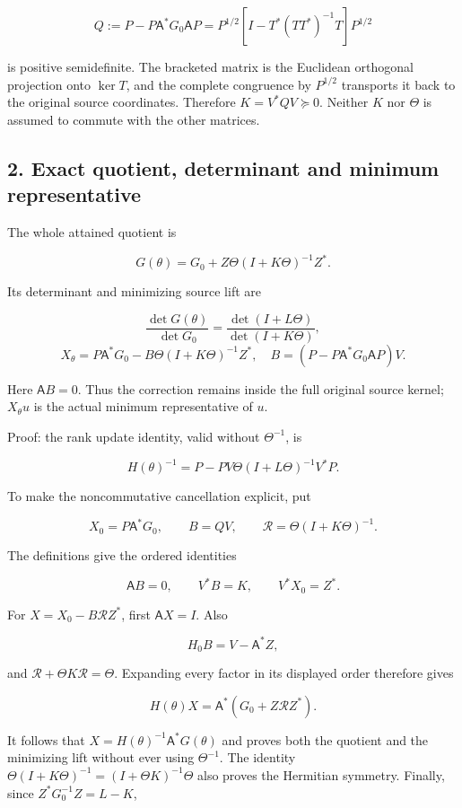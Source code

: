 \[
 Q:=P-P\mathsf A^*G_0\mathsf A P
 =P^{1/2}\!\left[I-T^*(TT^*)^{-1}T\right]P^{1/2}
\]

is positive semidefinite. The bracketed matrix is the Euclidean
orthogonal projection onto \(\ker T\), and the complete congruence by
\(P^{1/2}\) transports it back to the original source coordinates.
Therefore \(K=V^*QV\succeq0\). Neither \(K\) nor \(\Theta\) is assumed
to commute with the other matrices.

\subsection{2. Exact quotient, determinant and minimum
representative}\label{exact-quotient-determinant-and-minimum-representative}

The whole attained quotient is

\[
 \boxed{G(\theta)=G_0+Z\Theta(I+K\Theta)^{-1}Z^*.}
\]

Its determinant and minimizing source lift are

\[
 \boxed{\frac{\det G(\theta)}{\det G_0}
 =\frac{\det(I+L\Theta)}{\det(I+K\Theta)},}
\] \[
 \boxed{X_\theta=P\mathsf A^*G_0
 -B\Theta(I+K\Theta)^{-1}Z^*,\quad
 B=(P-P\mathsf A^*G_0\mathsf A P)V.}
\]

Here \(\mathsf A B=0\). Thus the correction remains inside the full
original source kernel; \(X_\theta u\) is the actual minimum
representative of \(u\).

Proof: the rank update identity, valid without \(\Theta^{-1}\), is

\[
 H(\theta)^{-1}=P-PV\Theta(I+L\Theta)^{-1}V^*P.
\]

To make the noncommutative cancellation explicit, put

\[
 X_0=P\mathsf A^*G_0,\qquad B=QV,
 \qquad \mathcal R=\Theta(I+K\Theta)^{-1}.
\]

The definitions give the ordered identities

\[
 \mathsf A B=0,\qquad V^*B=K,\qquad V^*X_0=Z^*.
\]

For \(X=X_0-B\mathcal R Z^*\), first \(\mathsf A X=I\). Also

\[
 H_0B=V-\mathsf A^*Z,
\]

and \(\mathcal R+\Theta K\mathcal R=\Theta\). Expanding every factor in
its displayed order therefore gives

\[
 H(\theta)X
 =\mathsf A^*\!\left(G_0+Z\mathcal R Z^*\right).
\]

It follows that \(X=H(\theta)^{-1}\mathsf A^*G(\theta)\) and proves both
the quotient and the minimizing lift without ever using \(\Theta^{-1}\).
The identity \(\Theta(I+K\Theta)^{-1}=(I+\Theta K)^{-1}\Theta\) also
proves the Hermitian symmetry. Finally, since \(Z^*G_0^{-1}Z=L-K\),


